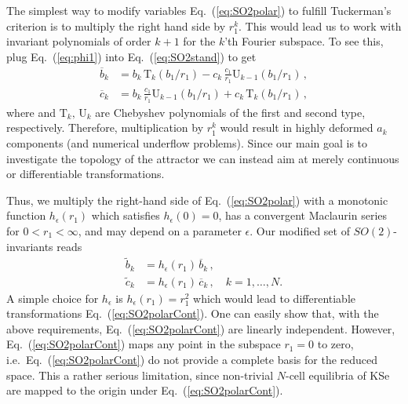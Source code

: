\documentclass[aip,cha,showpacs,reprint]{revtex4-1} %
\newcommand{\bseq}{\begin{subequations}}
\newcommand{\eseq}{\end{subequations}}
\newcommand{\refeq}  [1] {Eq.~(\ref{#1})}                   %
\newcommand{\ie}{{i.e.}}
\newcommand{\chebT}{\mathrm{T}}
\newcommand{\chebU}{\mathrm{U}}
\begin{document}
The simplest way to modify variables \refeq{eq:SO2polar} to fulfill Tuckerman's
criterion is to multiply the right hand side by $r_1^k$. This would lead us to
work with invariant polynomials of order $k+1$ for the $k$'th Fourier subspace.
To see this, plug \refeq{eq:phi1} into \refeq{eq:SO2stand} to get
\bseq\label{eq:SO2cheb}
  \begin{align}
    \overline{b}_k &=
		    b_k\, \chebT_k\left(b_1/r_1\right)-
		    c_k\,\frac{c_1}{r_1} \chebU_{k-1}\left(b_1/r_1\right)\,, \label{eq:SO2cheb1}\\
    \overline{c}_k &=
		    b_k\, \frac{c_1}{r_1} \chebU_{k-1}\left(b_1/r_1\right)+
		    c_k\,\chebT_k\left(b_1/r_1\right)\,,  \label{eq:SO2cheb2}
  \end{align}
\eseq
where and $\chebT_k,\,\chebU_k$ are Chebyshev polynomials of the first and second type, respectively.
Therefore, multiplication by $r_1^k$ would result in highly deformed $a_k$ components
(and numerical underflow problems). Since our main goal is to investigate the
topology of the attractor we can instead aim at merely continuous or
differentiable transformations.

Thus, we multiply the right-hand side of \refeq{eq:SO2polar} with a monotonic function
$h_\epsilon(r_1)$ which satisfies $h_\epsilon(0)=0$,
has a convergent Maclaurin series for $0<r_1<\infty$,
and may depend on a parameter $\epsilon$.
Our modified set of $SO(2)$-invariants reads
\bseq\label{eq:SO2polarCont}
  \begin{align}
    \tilde{b}_k &=
		    h_\epsilon(r_1)\,\overline{b}_k\,, \label{eq:SO2polarCont1}\\
    \tilde{c}_k &=
		    h_\epsilon(r_1)\,\overline{c}_k\,, \quad k=1,\ldots,N.\label{eq:SO2polarCont2}
  \end{align}
\eseq
A simple choice for $h_\epsilon$ is
$h_\epsilon(r_1)=r_1^2$ which would lead to differentiable transformations \refeq{eq:SO2polarCont}.
One can easily show that, with the above requirements,
\refeq{eq:SO2polarCont} are linearly independent. However,
\refeq{eq:SO2polarCont} maps any point in the subspace $r_1=0$ to zero, \ie\
\refeq{eq:SO2polarCont} do not provide a complete basis for the reduced space.
This a rather serious limitation, since non-trivial $N$-cell equilibria of
KSe are mapped to the origin under \refeq{eq:SO2polarCont}.
\end{document}
